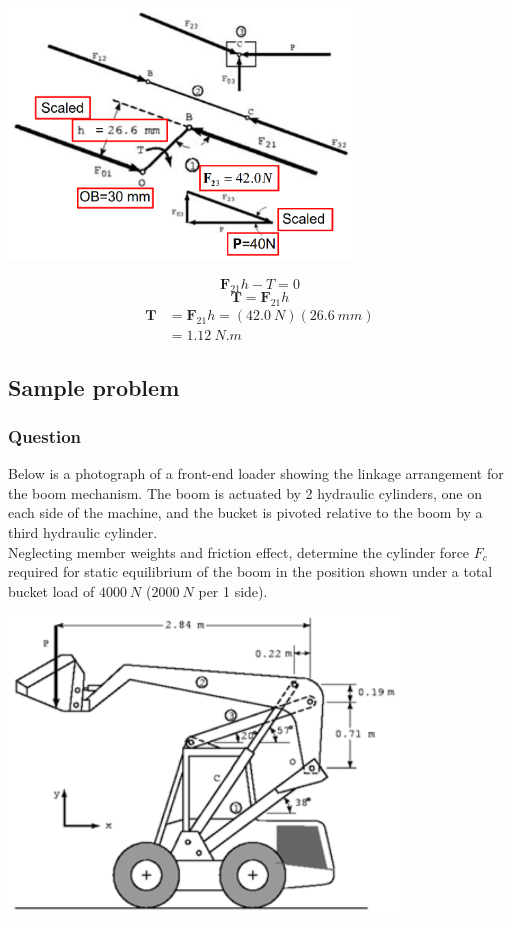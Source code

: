 \documentclass[11pt]{article}
\begin{document}
\begin{center}
\includegraphics[height=18em]{./images/graphical-static-force-analysis-all-links.png}
\end{center}
\[\boldsymbol{F}_{21} h - T = 0\]
\[\boldsymbol{T} = \boldsymbol{F}_{21} h\]
\begin{align*}
\boldsymbol{T} &= \boldsymbol{F}_{21} h = (\qty{42.0}{N}) (\qty{26.6}{mm}) \\
&= \qty{1.12}{N.m}
\end{align*}
\subsection{Sample problem}
\label{sec:org4d2b796}

\subsubsection{Question}
\label{sec:org242e3ea}
Below is a photograph of a front-end loader showing the linkage arrangement for the boom mechanism. The boom is actuated by 2 hydraulic cylinders, one on each side of the machine, and the bucket is pivoted relative to the boom by a third hydraulic cylinder.  \\

Neglecting member weights and friction effect, determine the cylinder force \(F_c\) required for static equilibrium of the boom in the position shown under a total bucket load of \(\qty{4000}{N}\) (\(\qty{2000}{N}\) per 1 side).

\begin{center}
\includegraphics[width=.9\linewidth]{./images/sample-problem-front-end-loader-dimensions.png}
\end{center}
\end{document}
